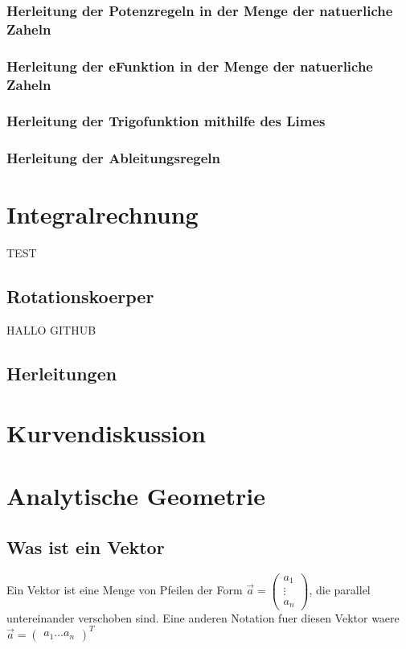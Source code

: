 \documentclass[a4paper]{article} %
\begin{document}
	\subsubsection{Herleitung der Potenzregeln in der Menge der natuerliche Zaheln}
	\subsubsection{Herleitung der eFunktion in der Menge der natuerliche Zaheln}
	\subsubsection{Herleitung der Trigofunktion mithilfe des Limes}
	\subsubsection{Herleitung der Ableitungsregeln}
	\section{Integralrechnung}
	TEST
	\subsection{Rotationskoerper}  
	HALLO GITHUB                                                       
	\subsection{Herleitungen}
	\section{Kurvendiskussion}
	\section{Analytische Geometrie}
	\subsection{Was ist ein Vektor}
	Ein Vektor ist eine Menge von Pfeilen der Form $\vec{a} = \begin{pmatrix} a_1 \\ \vdots \\ a_n \end{pmatrix} $, die parallel untereinander verschoben sind.
	Eine anderen Notation fuer diesen Vektor waere $\vec{a} = \begin{pmatrix} a_1  \hdots  a_n \end{pmatrix}^T $
\end{document}
